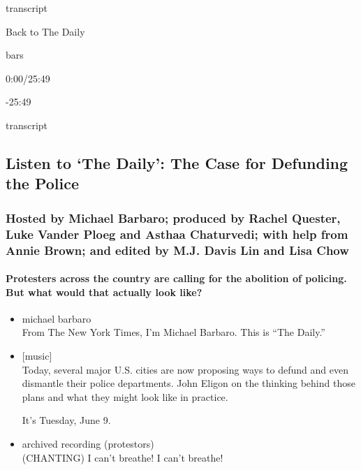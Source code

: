 transcript

Back to The Daily

bars

0:00/25:49

-25:49

transcript

\hypertarget{listen-to-the-daily-the-case-for-defunding-the-police-1}{%
\subsection{Listen to `The Daily': The Case for Defunding the
Police}\label{listen-to-the-daily-the-case-for-defunding-the-police-1}}

\hypertarget{hosted-by-michael-barbaro-produced-by-rachel-quester-luke-vander-ploeg-and-asthaa-chaturvedi-with-help-from-annie-brown-and-edited-by-mj-davis-lin-and-lisa-chow}{%
\subsubsection{Hosted by Michael Barbaro; produced by Rachel Quester,
Luke Vander Ploeg and Asthaa Chaturvedi; with help from Annie Brown; and
edited by M.J. Davis Lin and Lisa
Chow}\label{hosted-by-michael-barbaro-produced-by-rachel-quester-luke-vander-ploeg-and-asthaa-chaturvedi-with-help-from-annie-brown-and-edited-by-mj-davis-lin-and-lisa-chow}}

\hypertarget{protesters-across-the-country-are-calling-for-the-abolition-of-policing-but-what-would-that-actually-look-like}{%
\paragraph{Protesters across the country are calling for the abolition
of policing. But what would that actually look
like?}\label{protesters-across-the-country-are-calling-for-the-abolition-of-policing-but-what-would-that-actually-look-like}}

\begin{itemize}
\item
  michael barbaro\\
  From The New York Times, I'm Michael Barbaro. This is ``The Daily.''
\item
  {[}music{]}\\
  Today, several major U.S. cities are now proposing ways to defund and
  even dismantle their police departments. John Eligon on the thinking
  behind those plans and what they might look like in practice.

  It's Tuesday, June 9.
\item
  archived recording (protestors)\\
  (CHANTING) I can't breathe! I can't breathe!
\end{itemize}

